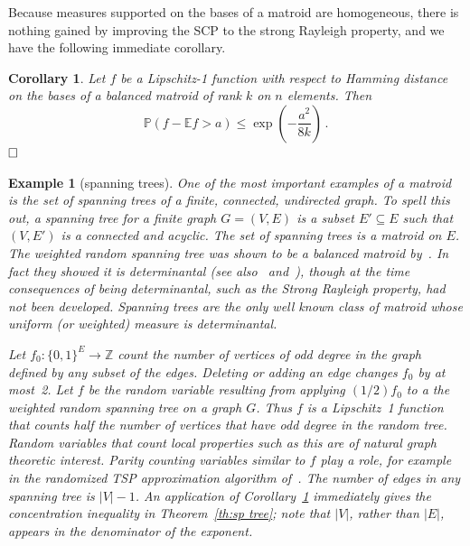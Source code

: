 \documentclass[10pt]{article}
\theoremstyle{plain}
\newtheorem{cor}[thm]{Corollary}
\newtheorem{example}[thm]{Example}
\theoremstyle{remark}
\def\Cox{\qed}
\def\Z{\mathbb{Z}}
\def\E{{\mathbb E}}
\def\P{{\mathbb P}}
\def\Cox{\hfill \Box}
\begin{document}
Because measures supported on the bases of a matroid are homogeneous,
there is nothing gained by improving the SCP to the strong Rayleigh
property, and we have the following immediate corollary.
%
\begin{cor} \label{cor:balanced}
Let $f$ be a Lipschitz-1 function with respect to Hamming
distance on the bases of a balanced matroid of rank $k$
on $n$ elements.  Then
$$\P (f - \E f > a) \leq \exp \left ( - \frac{a^2}{8k} \right ) \, .$$
$\Cox$
\end{cor}


\begin{example}[spanning trees] \label{eg:spanning tree}
One of the most important examples of a matroid is the
set of spanning trees of a finite, connected, undirected graph.
To spell this out, a spanning tree for a finite graph $G = (V,E)$
is a subset $E' \subseteq E$ such that $(V,E')$ is a connected
and acyclic.  The set of spanning trees is a matroid on $E$.
The weighted random spanning tree was shown to be a balanced
matroid by~\cite[Theorem~1]{burton-pemantle}.  In fact they
showed it is determinantal (see also~\cite[Example~1.1]{lyons03}
and~\cite[Example~4.3.2]{HKPV}), though at the time
consequences of being determinantal, such as
the Strong Rayleigh property, had not been developed.
Spanning trees are the only well known class of matroid
whose uniform (or weighted) measure is determinantal.

Let $f_0: \{ 0 , 1 \}^E \to \Z$ count the number of vertices
of odd degree in the graph defined by any subset of the edges.
Deleting or adding an edge changes $f_0$ by at most~2.
Let $f$ be the random variable resulting from applying
$(1/2) f_0$ to a the weighted random spanning tree on a
graph $G$.  Thus $f$ is a Lipschitz~1 function that counts
half the number of vertices that have odd degree in the
random tree.  Random variables that count local
properties such as this are of natural graph theoretic interest.
Parity counting variables similar to $f$ play a role, for example
in the randomized TSP approximation algorithm of~\cite{saberi}.
The number of edges in any spanning tree is $|V| - 1$.  An
application of Corollary~\ref{cor:balanced} immediately gives
the concentration inequality in Theorem~\ref{th:sp tree};
note that $|V|$, rather than $|E|$, appears in the denominator
of the exponent.
\end{example}
\end{document}
